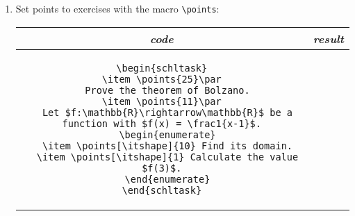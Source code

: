 \documentclass[12pt,a4page]{article}
\begin{document}
\begin{enumerate}
\begin{center}
\begin{tabular}{c|p{}}
    \end{tabular}
  \end{center}
\item Set points to exercises with the macro \verb|\points|:
  \begin{center}
    \footnotesize
    \begin{tabular}{c|p{}}
      \textit{\large code} & \hfill\textit{\large result}\hfill\phantom{.} \\ \hline
      \begin{minipage}[t]{0.4\textwidth}
\begin{lstlisting}
\begin{schltask}
\item \points{25}\par
  Prove the theorem of Bolzano.
\item \points{11}\par
  Let $f:\mathbb{R}\rightarrow\mathbb{R}$ be a function with $f(x) = \frac1{x-1}$.
  \begin{enumerate}
  \item \points[\itshape]{10} Find its domain.
  \item \points[\itshape]{1} Calculate the value $f(3)$.
  \end{enumerate}
\end{schltask}
\end{lstlisting}
\end{minipage} &
                 \begin{schltask}
                 \item \points{25}\par
                   Prove the theorem of Bolzano.
                 \item \points{11}\par
                   Let $f:\mathbb{R}\rightarrow\mathbb{R}$ be a function with $f(x) = \frac1{x-1}$.
                   \begin{enumerate}
                   \item \points[\itshape]{10} Find its domain.
                   \item \points[\itshape]{1} Calculate the value $f(3)$.
                   \end{enumerate}
                 \end{schltask}

\end{tabular}
\end{center}
\end{enumerate}
\end{document}
